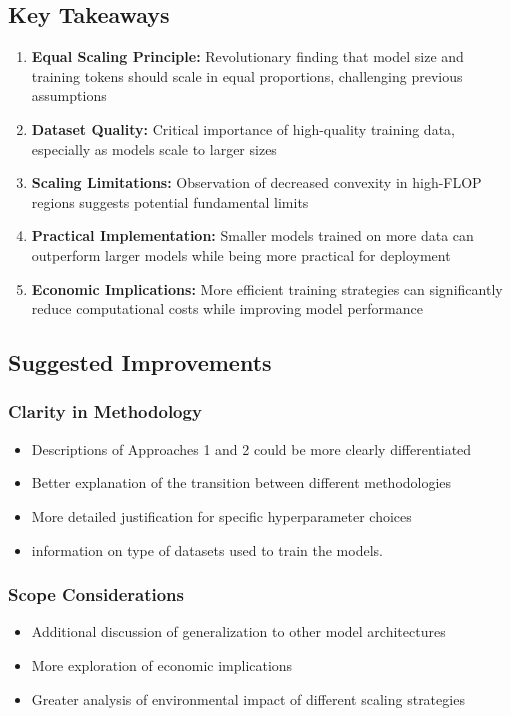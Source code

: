 \documentclass{article}
\begin{document}
\subsection{Key Takeaways}
\begin{enumerate}
    \item \textbf{Equal Scaling Principle:} Revolutionary finding that model size and training tokens should scale in equal proportions, challenging previous assumptions
    
    \item \textbf{Dataset Quality:} Critical importance of high-quality training data, especially as models scale to larger sizes
    
    \item \textbf{Scaling Limitations:} Observation of decreased convexity in high-FLOP regions suggests potential fundamental limits
    
    \item \textbf{Practical Implementation:} Smaller models trained on more data can outperform larger models while being more practical for deployment
    
    \item \textbf{Economic Implications:} More efficient training strategies can significantly reduce computational costs while improving model performance
\end{enumerate}

\subsection{Suggested Improvements}
\subsubsection{Clarity in Methodology}
\begin{itemize}
    \item Descriptions of Approaches 1 and 2 could be more clearly differentiated
    \item Better explanation of the transition between different methodologies
    \item More detailed justification for specific hyperparameter choices
    \item information on type of datasets used to train the models.
\end{itemize}

\subsubsection{Scope Considerations}
\begin{itemize}
    \item Additional discussion of generalization to other model architectures
    \item More exploration of economic implications
    \item Greater analysis of environmental impact of different scaling strategies
\end{itemize}
\end{document}
